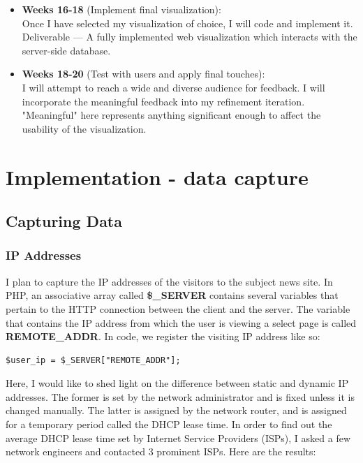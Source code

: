 \documentclass[12pt]{article}
\begin{document}
\begin{itemize}
\item[] \textbf{Weeks 16-18} (Implement final visualization): \\
Once I have selected my visualization of choice, I will code and implement it. \\
Deliverable --- A fully implemented web visualization which interacts with the server-side database.

\item[] \textbf{Weeks 18-20} (Test with users and apply final touches): \\
I will attempt to reach a wide and diverse audience for feedback. I will incorporate the meaningful feedback into my refinement iteration. "Meaningful" here represents anything significant enough to affect the usability of the visualization.

\end{itemize}

\vfill

\section{Implementation - data capture}
\subsection{Capturing Data}
\subsubsection{IP Addresses}
I plan to capture the IP addresses of the visitors to the subject news site. In PHP, an associative array called \textbf{\$\_SERVER}  contains several variables that pertain to the HTTP connection between the client and the server. The variable that contains the IP address from which the user is viewing a select page is called \textbf{REMOTE\_ADDR}. In code, we register the visiting IP address like so:
\begin{lstlisting}
$user_ip = $_SERVER["REMOTE_ADDR"];
\end{lstlisting}

Here, I would like to shed light on the difference between static and dynamic IP addresses. The former is set by the network administrator and is fixed unless it is changed manually. The latter is assigned by the network router, and is assigned for a temporary period called the DHCP lease time. In order to find out the average DHCP lease time set by Internet Service Providers (ISPs), I asked a few network engineers and contacted 3 prominent ISPs. Here are the results:
\vspace{0.3in}
\end{document}
